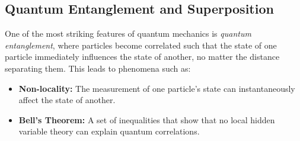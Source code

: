 \subsection{Quantum Entanglement and Superposition}
One of the most striking features of quantum mechanics is \textit{quantum entanglement}, where particles become correlated such that the state of one particle immediately influences the state of another, no matter the distance separating them. This leads to phenomena such as:
\begin{itemize}
    \item \textbf{Non-locality:} The measurement of one particle's state can instantaneously affect the state of another.
    \item \textbf{Bell's Theorem:} A set of inequalities that show that no local hidden variable theory can explain quantum correlations.
\end{itemize}


%


